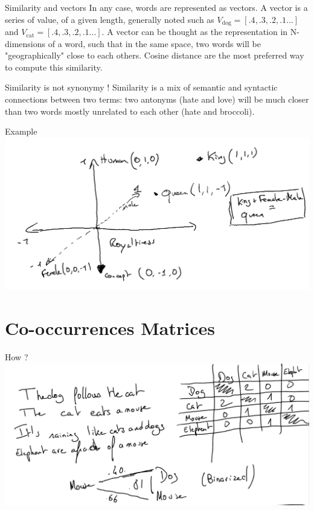 \documentclass[aspectratio=169]{beamer}
\begin{document}
\begin{frame}{Similarity and vectors}
    In any case, words are represented as vectors. A vector is a series of value, of a given length, generally noted such as $V_{\text{dog}} = [.4, .3, .2, .1 ...] $ and $V_{\text{cat}} = [.4, .3, .2, .1 ...] $. A vector can be thought as the representation in N-dimensions of a word, such that in the same space, two words will be "geographically" close to each others. Cosine distance are the most preferred way to compute this similarity.

    Similarity is not synonymy ! Similarity is a mix of semantic and syntactic connections between two terms: two antonyms (hate and love) will be much closer than two words mostly unrelated to each other (hate and broccoli).
\end{frame}

\begin{frame}{Example}
    \centering
    \includegraphics[width=.9\linewidth]{nlp-for-ch/images/vectors.png}
\end{frame}

\section{Co-occurrences Matrices}

\begin{frame}{How ?}
    \centering
    \includegraphics[width=.9\linewidth]{nlp-for-ch/images/cooccmatrices.png}
\end{frame}
\end{document}
